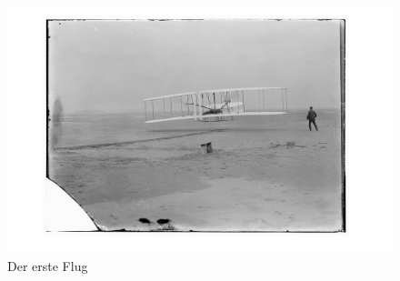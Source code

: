 \documentclass[a4paper]{amsart}
\begin{document}
\begin{figure}
    \caption{Der erste Flug}
    \includegraphics[width=\textwidth]{bild.png}
\end{figure}
\end{document}
